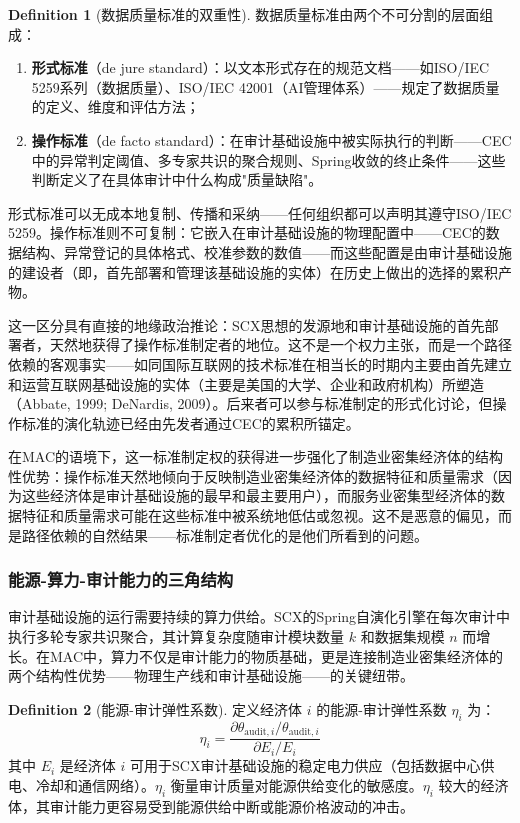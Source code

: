 \documentclass[12pt,a4paper]{ctexart}
\theoremstyle{definition}
\newtheorem{definition}{Definition}[section]
\theoremstyle{remark}
\begin{document}
\begin{definition}[数据质量标准的双重性]
数据质量标准由两个不可分割的层面组成：
\begin{enumerate}[label=(\alph*)]
    \item \textbf{形式标准}（de jure standard）：以文本形式存在的规范文档——如ISO/IEC 5259系列（数据质量）、ISO/IEC 42001（AI管理体系）——规定了数据质量的定义、维度和评估方法；
    \item \textbf{操作标准}（de facto standard）：在审计基础设施中被实际执行的判断——CEC中的异常判定阈值、多专家共识的聚合规则、Spring收敛的终止条件——这些判断定义了在具体审计中什么构成"质量缺陷"。
\end{enumerate}
形式标准可以无成本地复制、传播和采纳——任何组织都可以声明其遵守ISO/IEC 5259。操作标准则不可复制：它嵌入在审计基础设施的物理配置中——CEC的数据结构、异常登记的具体格式、校准参数的数值——而这些配置是由审计基础设施的建设者（即，首先部署和管理该基础设施的实体）在历史上做出的选择的累积产物。
\end{definition}

这一区分具有直接的地缘政治推论：SCX思想的发源地和审计基础设施的首先部署者，天然地获得了操作标准制定者的地位。这不是一个权力主张，而是一个路径依赖的客观事实——如同国际互联网的技术标准在相当长的时期内主要由首先建立和运营互联网基础设施的实体（主要是美国的大学、企业和政府机构）所塑造（Abbate, 1999; DeNardis, 2009）。后来者可以参与标准制定的形式化讨论，但操作标准的演化轨迹已经由先发者通过CEC的累积所锚定。

在MAC的语境下，这一标准制定权的获得进一步强化了制造业密集经济体的结构性优势：操作标准天然地倾向于反映制造业密集经济体的数据特征和质量需求（因为这些经济体是审计基础设施的最早和最主要用户），而服务业密集型经济体的数据特征和质量需求可能在这些标准中被系统地低估或忽视。这不是恶意的偏见，而是路径依赖的自然结果——标准制定者优化的是他们所看到的问题。

\subsubsection*{能源-算力-审计能力的三角结构}

审计基础设施的运行需要持续的算力供给。SCX的Spring自演化引擎在每次审计中执行多轮专家共识聚合，其计算复杂度随审计模块数量 $k$ 和数据集规模 $n$ 而增长。在MAC中，算力不仅是审计能力的物质基础，更是连接制造业密集经济体的两个结构性优势——物理生产线和审计基础设施——的关键纽带。

\begin{definition}[能源-审计弹性系数]
定义经济体 $i$ 的能源-审计弹性系数 $\eta_i$ 为：
\begin{equation}
\eta_i = \frac{\partial \theta_{\text{audit}, i} / \theta_{\text{audit}, i}}{\partial E_i / E_i}
\end{equation}
其中 $E_i$ 是经济体 $i$ 可用于SCX审计基础设施的稳定电力供应（包括数据中心供电、冷却和通信网络）。$\eta_i$ 衡量审计质量对能源供给变化的敏感度。$\eta_i$ 较大的经济体，其审计能力更容易受到能源供给中断或能源价格波动的冲击。
\end{definition}
\end{document}
